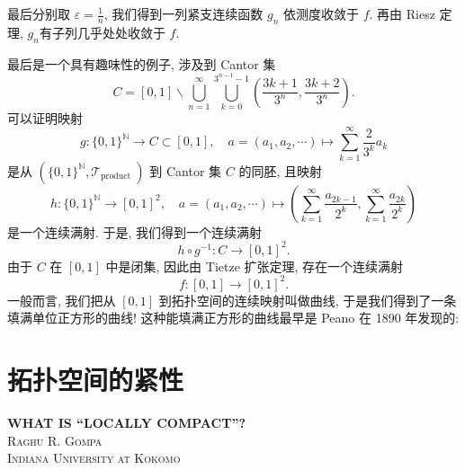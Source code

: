\documentclass[options]{article}
\begin{document}
最后分别取 $\varepsilon=\frac{1}{n}$, 我们得到一列紧支连续函数 $g_n$ 依测度收敛于 $f$. 再由 Riesz 定理, $g_n$有子列几乎处处收敛于 $f$.

最后是一个具有趣味性的例子, 涉及到 Cantor 集
\[
C=[0,1] \backslash \bigcup_{n=1}^{\infty} \bigcup_{k=0}^{3^{n-1}-1}\left(\frac{3 k+1}{3^n}, \frac{3 k+2}{3^n}\right) .
\]
可以证明映射
\[
g:\{0,1\}^{\mathbb{N}} \rightarrow C \subset[0,1], \quad a=\left(a_1, a_2, \cdots\right) \mapsto \sum_{k=1}^{\infty} \frac{2}{3^k} a_k
\]
是从 $\left(\{0,1\}^{\mathbb{N}}, \mathscr{T}_{\text {product }}\right)$ 到 Cantor 集 $C$ 的同胚, 且映射
\[
h:\{0,1\}^{\mathbb{N}} \rightarrow[0,1]^2, \quad a=\left(a_1, a_2, \cdots\right) \mapsto\left(\sum_{k=1}^{\infty} \frac{a_{2 k-1}}{2^k}, \sum_{k=1}^{\infty} \frac{a_{2 k}}{2^k}\right)
\]
是一个连续满射. 于是, 我们得到一个连续满射
\[
h \circ g^{-1}: C \rightarrow[0,1]^2 .
\]
由于 $C$ 在 $[0,1]$ 中是闭集, 因此由 Tietze 扩张定理, 存在一个连续满射
\[
f:[0,1] \rightarrow[0,1]^2 .
\]
一般而言, 我们把从 $[0,1]$ 到拓扑空间的连续映射叫做曲线, 于是我们得到了一条填满单位正方形的曲线! 这种能填满正方形的曲线最早是 Peano 在 1890 年发现的:
\section{拓扑空间的紧性}
\begin{center}{\bf\Huge{WHAT IS ``LOCALLY COMPACT''?
		}}\\
	{\scshape{Raghu R. Gompa\\Indiana University at Kokomo}}
\end{center}
\end{document}
